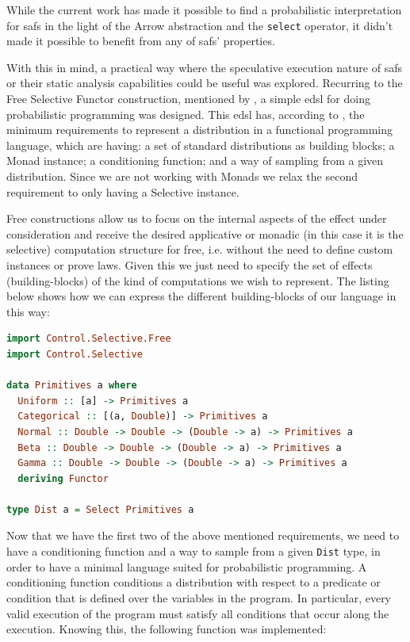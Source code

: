 \documentclass[
  oneside,
  11pt, a4paper,
  footinclude=true,
  headinclude=true,
  cleardoublepage=empty
]{scrbook}
\theoremstyle{definition}
\theoremstyle{definition}
\begin{document}
    While the current work has made it possible to find a probabilistic interpretation for \glspl{saf} in the light of the Arrow abstraction and the \texttt{select} operator, it didn't made it possible to benefit from any of \glspl{saf}' properties. 
    
    With this in mind, a practical way where the speculative execution nature of \glspl{saf} or their static analysis capabilities could be useful was explored. Recurring to the Free Selective Functor construction, mentioned by \cite{andrey2019selective}, a simple \gls{edsl} for doing probabilistic programming was designed. This \gls{edsl} has, according to \cite{Scibior:2015:PPP:2887747.2804317, gordon2014probabilistic, meent2018introduction}, the minimum requirements to represent a distribution in a functional programming language, which are having: a set of standard distributions as building blocks; a Monad instance; a conditioning function; and a way of sampling from a given distribution. Since we are not working with Monads we relax the second requirement to only having a Selective instance.
    
    Free constructions allow us to focus on the internal aspects of the effect under consideration and receive the desired applicative or monadic (in this case it is the selective) computation structure for free, i.e. without the need to define custom instances or prove laws. Given this we just need to specify the set of effects (building-blocks) of the kind of computations we wish to represent. The listing below shows how we can express the different building-blocks of our language in this way:
    
        \begin{lstlisting}[language=Haskell, caption={eDSL primitive building-blocks},captionpos=b]
import Control.Selective.Free
import Control.Selective

data Primitives a where
  Uniform :: [a] -> Primitives a
  Categorical :: [(a, Double)] -> Primitives a
  Normal :: Double -> Double -> (Double -> a) -> Primitives a
  Beta :: Double -> Double -> (Double -> a) -> Primitives a
  Gamma :: Double -> Double -> (Double -> a) -> Primitives a
  deriving Functor

type Dist a = Select Primitives a
        \end{lstlisting}
        
    Now that we have the first two of the above mentioned requirements, we need to have a conditioning function and a way to sample from a given \texttt{Dist} type, in order to have a minimal language suited for probabilistic programming. A conditioning function conditions a distribution with respect to a predicate or condition that is defined over the variables in the program. In particular, every valid execution of the program must satisfy all conditions that occur along the execution. Knowing this, the following function was implemented:
    
\end{document}
